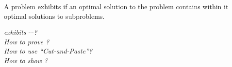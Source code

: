 
\begin{frame}{}
  \begin{definition}
    A problem exhibits \textbf{\emph{}} if
    an optimal solution to the problem contains within it optimal solutions to subproblems.
  \end{definition}

  \pause
  \vspace{0.30cm}
  \begin{center}
    {\it {} exhibits $\cdots$?} \\[6pt]
    {\it How to prove ?} \\[6pt]
    {\it How to use ``Cut-and-Paste''?} \\[6pt]
    {\it How to show ?}  \\[30pt]

    \pause
  \end{center}
\end{frame}
